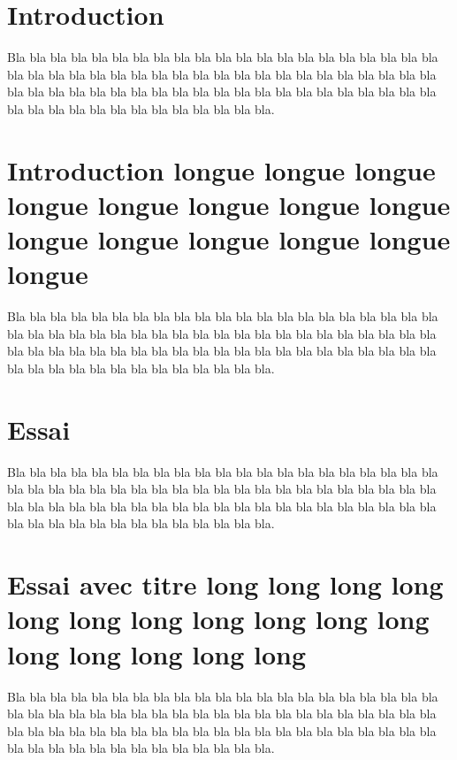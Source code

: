 \documentclass{book}
\begin{document}
\chapter*{Introduction}

Bla bla bla bla bla bla bla bla bla bla bla bla bla bla bla bla bla bla bla
bla bla bla bla bla bla bla bla bla bla bla bla bla bla bla bla bla bla bla
bla bla bla bla bla bla bla bla bla bla bla bla bla bla bla bla bla bla bla
bla bla bla bla bla bla bla bla bla bla bla bla bla bla bla bla bla bla bla.


\chapter*{Introduction longue longue longue longue longue longue longue longue longue longue longue longue longue longue}

Bla bla bla bla bla bla bla bla bla bla bla bla bla bla bla bla bla bla bla
bla bla bla bla bla bla bla bla bla bla bla bla bla bla bla bla bla bla bla
bla bla bla bla bla bla bla bla bla bla bla bla bla bla bla bla bla bla bla
bla bla bla bla bla bla bla bla bla bla bla bla bla bla bla bla bla bla bla.


\chapter{Essai}

Bla bla bla bla bla bla bla bla bla bla bla bla bla bla bla bla bla bla bla
bla bla bla bla bla bla bla bla bla bla bla bla bla bla bla bla bla bla bla
bla bla bla bla bla bla bla bla bla bla bla bla bla bla bla bla bla bla bla
bla bla bla bla bla bla bla bla bla bla bla bla bla bla bla bla bla bla bla.


\setcounter{chapter}{28}

\renewcommand{\thechapter}{\Roman{chapter}}
\makeatletter\renewcommand{\@chapapp}{Very long chapter name}\makeatother
\chapter{Essai avec titre long long long long long long long long long long long long long long long long}

Bla bla bla bla bla bla bla bla bla bla bla bla bla bla bla bla bla bla bla
bla bla bla bla bla bla bla bla bla bla bla bla bla bla bla bla bla bla bla
bla bla bla bla bla bla bla bla bla bla bla bla bla bla bla bla bla bla bla
bla bla bla bla bla bla bla bla bla bla bla bla bla bla bla bla bla bla bla.
\end{document}
